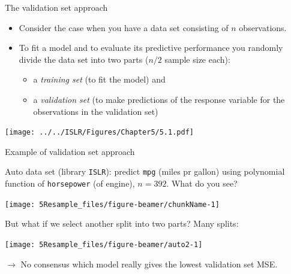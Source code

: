 \documentclass[
  10pt,
  ignorenonframetext,
]{beamer}
\providecommand{\tightlist}{%
  \setlength{\itemsep}{0pt}\setlength{\parskip}{0pt}}
\begin{document}
\begin{frame}
\begin{block}{The validation set approach}
\protect\hypertarget{the-validation-set-approach}{}
\vspace{2mm}

\begin{itemize}
\item
  Consider the case when you have a data set consisting of \(n\)
  observations.
\item
  To fit a model and to evaluate its predictive performance you randomly
  divide the data set into two parts (\(n/2\) sample size each):

  \begin{itemize}
  \tightlist
  \item
    a \emph{training set} (to fit the model) and
  \item
    a \emph{validation set} (to make predictions of the response
    variable for the observations in the validation set)
  \end{itemize}
\end{itemize}

\vspace{4mm}

\texttt{[image: ../../ISLR/Figures/Chapter5/5.1.pdf]}
\end{block}
\end{frame}

\begin{frame}[fragile]
\begin{block}{Example of validation set approach}
\protect\hypertarget{example-of-validation-set-approach}{}
\vspace{2mm}

Auto data set (library \texttt{ISLR}): predict \texttt{mpg} (miles pr
gallon) using polynomial function of \texttt{horsepower} (of engine),
\(n=392\). What do you see?

\begin{center}\texttt{[image: 5Resample\_files/figure-beamer/chunkName-1]} \end{center}
\end{block}
\end{frame}

\begin{frame}
But what if we select another split into two parts? Many splits:

\begin{center}\texttt{[image: 5Resample\_files/figure-beamer/auto2-1]} \end{center}

\vspace{2mm}

\(\rightarrow\) No consensus which model really gives the lowest
validation set MSE.
\end{frame}
\end{document}
